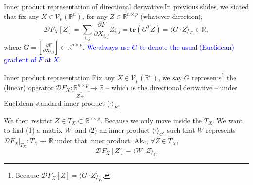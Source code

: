 \documentclass[aspectratio=43, 10pt]{beamer}
\begin{document}
  \begin{frame}[t]{Inner product representation of directional derivative}
  \vspace{-0.37cm}
  In previous slides, we stated that fix any $X\in \mathcal{V}_p (\mathbb{R}^n)$, for any $Z \in \mathbb{R}^{n \times p}$ (whatever direction), 
  $$\mathcal{D}F_X[Z] = \sum_{i,j}\frac{\partial F}{\partial X_{i,j}} Z_{i,j}
  = \textbf{tr}(G^T Z) = \langle G \cdot Z \rangle_E \in \mathbb{R},$$ 
  where $G = [\frac{\partial F}{\partial X_{i,j}}] \in \mathbb{R}^{n \times p}$. \textcolor{blue}{We always use $G$ to denote the usual (Euclidean) gradient of $F$ at $X$.}

  \pause
  \vspace{-0.1cm}
  \begin{block}{Inner product representation}
      Fix any $X \in \mathcal{V}_p (\mathbb{R}^n)$, we say $G$ represents\footnote{Because $\mathcal{D}F_X[Z] = \langle G \cdot Z \rangle_E$.}  the (linear) operator $\mathcal{D}F_X: \underbrace{\mathbb{R}^{n \times p}}_{Z \in } \to \mathbb{R}$ -- which is the directional derivative -- under Euclidean standard inner product $\langle \cdot \rangle_E$.
  \end{block}

  \pause
  We then restrict $Z \in T_X \subset \mathbb{R}^{n \times p}$. Because we only move inside the $T_X$. 
  We want to find (1) a matrix $W$, and (2) an inner product $\langle \cdot \rangle_C$, such that $W$ represents $\mathcal{D}F_X|_{T_X}: T_X \to \mathbb{R}$ under that inner product. Aka, $\forall Z \in T_X$, $$\mathcal{D}F_X[Z] = \langle W \cdot Z \rangle_C$$
  
  \end{frame}
\end{document}
